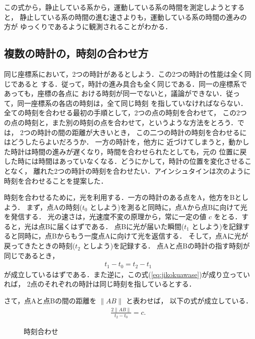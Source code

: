 この式から，静止している系から，運動している系の時間を測定しようとすると，
静止している系の時間の進む速さよりも，運動している系の時間の進みの方が
ゆっくりであるように観測されることがわかる．

    \subsection{複数の時計の，時刻の合わせ方}
    同じ座標系において，2つの時計があるとしよう．この2つの時計の性能は全く同じであると
    する．従って，時計の進み具合も全く同じである．同一の座標系であっても，座標の各点に
    おける時刻が同一でないと，議論ができない．従って，同一座標系の各店の時刻は，全て同じ時刻
    を指していなければならない．全ての時刻を合わせる最初の手順として，2つの点の時刻を合わせて，
    この2つの点の時刻と，また別の時刻の点を合わせて，というような方法をとろう．では，
    2つの時計の間の距離が大きいとき，
    この二つの時計の時刻を合わせるにはどうしたらよいだろうか．
    一方の時計を，他方に
    近づけてしまうと，動かした時計は時間の進みが遅くなり，時間を合わせられたとしても，元の
    位置に戻した時には時間はあっていなくなる．どうにかして，時計の位置を変化させることなく，
    離れた2つの時計の時刻を合わせたい．アインシュタインは次のように時刻を合わせることを提案した．

    時刻を合わせるために，光を利用する．一方の時計のある点をA，他方をBとしよう．
    まず，点Aの時刻($t_{0}$ としよう)を測ると同時に，点Aから点Bに向けて光を発信する．
    光の速さは，光速度不変の原理から，常に一定の値 $c$ をとる．すると，光は点Bに届くはずである．
    点Bに光が届いた瞬間($t_{1}$ としよう)を記録すると同時に，点Bからもう一度点Aに向けて光を返信する．
    そして，点Aに光が戻ってきたときの時刻($t_{2}$ としよう)を記録する．
    点Aと点Bの時計の指す時刻が同じであるとき，
    \begin{align}\label{eq:jikokuawase}
    t_{1}-t_{0}=t_{2}-t_{1}
    \end{align}
    が成立しているはずである．また逆に，この式(\ref{eq:jikokuawase})が成り立っていれば，
    2点のそれぞれの時計は同じ時刻を指しているとする．

    さて，点Aと点Bの間の距離を $\|AB\|$ と表わせば，
    以下の式が成立している．
    \begin{align}
    \frac{2\| AB \|}{t_{2}-t_{0}}=c.
    \end{align}
                \begin{figure}[hbt]
                    \begin{center}
                        \caption{時刻合わせ}
                        \label{fig:jikokuawase}
                    \end{center}
                \end{figure}


